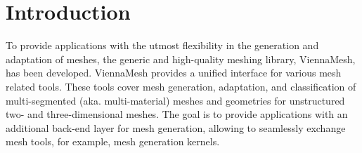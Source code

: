 
\section{Introduction}  %

To provide applications with the utmost flexibility in the generation and adaptation of meshes, the generic and high-quality meshing library, ViennaMesh, has been developed. ViennaMesh provides a unified interface for various mesh related tools. These tools cover mesh generation, adaptation, and classification of multi-segmented (aka. multi-material) meshes and geometries for unstructured two- and three-dimensional meshes. The goal is to provide applications with an additional back-end layer for mesh generation, allowing to seamlessly exchange mesh tools, for example, mesh generation kernels.


